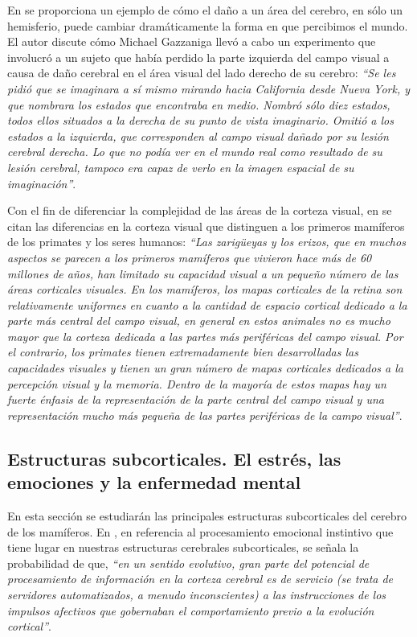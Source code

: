 En \cite{Restak1994} se proporciona un ejemplo de cómo el daño a un área del cerebro, en sólo un hemisferio, puede cambiar dramáticamente la forma en que percibimos el mundo. El autor discute cómo Michael Gazzaniga llevó a cabo un experimento que involucró a un sujeto que había perdido la parte izquierda del campo visual a causa de daño cerebral en el área visual del lado derecho de su cerebro: {\it ``Se les pidió que se imaginara a sí mismo mirando hacia California desde Nueva York, y que nombrara los estados que encontraba en medio. Nombró sólo diez estados, todos ellos situados a la derecha de su punto de vista imaginario. Omitió a los estados a la izquierda, que corresponden al campo visual dañado por su lesión cerebral derecha. Lo que no podía ver en el mundo real como resultado de su lesión cerebral, tampoco era capaz de verlo en la imagen espacial de su imaginación''}.

Con el fin de diferenciar la complejidad de las áreas de la corteza visual, en \cite{JohnAllman2000} se citan las diferencias en la corteza visual que distinguen a los primeros mamíferos de los primates y los seres humanos: {\it ``Las zarigüeyas y los erizos, que en muchos aspectos se parecen a los primeros mamíferos que vivieron hace más de 60 millones de años, han limitado su capacidad visual a un pequeño número de las áreas corticales visuales. En los mamíferos, los mapas corticales de la retina son relativamente uniformes en cuanto a la cantidad de espacio cortical dedicado a la parte más central del campo visual, en general en estos animales no es mucho mayor que la corteza dedicada a las partes más periféricas del campo visual. Por el contrario, los primates tienen extremadamente bien desarrolladas las capacidades visuales y tienen un gran número de mapas corticales dedicados a la percepción visual y la memoria. Dentro de la mayoría de estos mapas hay un fuerte énfasis de la representación de la parte central del campo visual y una representación mucho más pequeña de las partes periféricas de la campo visual''}.

\subsection{Estructuras subcorticales. El estrés, las emociones y la enfermedad mental}
\label{sec::estructuras-subcorticales}

En esta sección se estudiarán las principales estructuras subcorticales del cerebro de los mamíferos. En \cite{Panksepp1998}, en referencia al procesamiento emocional instintivo que tiene lugar en nuestras estructuras cerebrales subcorticales, se señala la probabilidad de que, {\it ``en un sentido evolutivo, gran parte del potencial de procesamiento de información en la corteza cerebral es de servicio (se trata de servidores automatizados, a menudo inconscientes) a las instrucciones de los impulsos afectivos que gobernaban el comportamiento previo a la evolución cortical''}.

